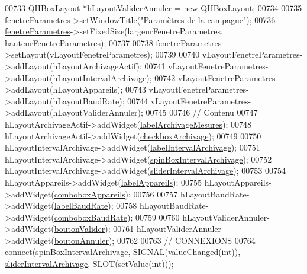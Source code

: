 \begin{DoxyCode}
00733     QHBoxLayout *hLayoutValiderAnnuler = \textcolor{keyword}{new} QHBoxLayout;
00734 
00735     \hyperlink{class_i_h_m_rov_a277956dfb79e5345e5ae0117fe41ddf2}{fenetreParametres}->setWindowTitle(\textcolor{stringliteral}{"Paramètres de la campagne"});
00736     \hyperlink{class_i_h_m_rov_a277956dfb79e5345e5ae0117fe41ddf2}{fenetreParametres}->setFixedSize(largeurFenetreParametres, hauteurFenetreParametres);
00737 
00738     \hyperlink{class_i_h_m_rov_a277956dfb79e5345e5ae0117fe41ddf2}{fenetreParametres}->setLayout(vLayoutFenetreParametres);
00739 
00740     vLayoutFenetreParametres->addLayout(hLayoutArchivageActif);
00741     vLayoutFenetreParametres->addLayout(hLayoutIntervalArchivage);
00742     vLayoutFenetreParametres->addLayout(hLayoutAppareils);
00743     vLayoutFenetreParametres->addLayout(hLayoutBaudRate);
00744     vLayoutFenetreParametres->addLayout(hLayoutValiderAnnuler);
00745 
00746     \textcolor{comment}{// Contenu}
00747     hLayoutArchivageActif->addWidget(\hyperlink{class_i_h_m_rov_a58e157352986f690bca4b79b9b05ee1d}{labelArchivageMesures});
00748     hLayoutArchivageActif->addWidget(\hyperlink{class_i_h_m_rov_a85be76b5fee7281642db582a79a53511}{checkboxArchivage});
00749 
00750     hLayoutIntervalArchivage->addWidget(\hyperlink{class_i_h_m_rov_a42fb93c9764bfc2fe81ba65fc02d8de2}{labelIntervalArchivage});
00751     hLayoutIntervalArchivage->addWidget(\hyperlink{class_i_h_m_rov_abc906e8e992ecdf5eb1dae5dc622b768}{spinBoxIntervalArchivage});
00752     hLayoutIntervalArchivage->addWidget(\hyperlink{class_i_h_m_rov_a8c55c93ee14ee51335e72af07b521312}{sliderIntervalArchivage});
00753 
00754     hLayoutAppareils->addWidget(\hyperlink{class_i_h_m_rov_ac6f93c34da2a4e24f743e61fd5d62405}{labelAppareils});
00755     hLayoutAppareils->addWidget(\hyperlink{class_i_h_m_rov_a12b970f1d2a170f14a01a684787904a5}{comboboxAppareils});
00756 
00757     hLayoutBaudRate->addWidget(\hyperlink{class_i_h_m_rov_a6e9a97a5cd38bfd92e6114c4299be7ee}{labelBaudRate});
00758     hLayoutBaudRate->addWidget(\hyperlink{class_i_h_m_rov_a542c0cf87de612cd529b0753b60e4f95}{comboboxBaudRate});
00759 
00760     hLayoutValiderAnnuler->addWidget(\hyperlink{class_i_h_m_rov_a4294b6c808089083906fb0815d1c9c27}{boutonValider});
00761     hLayoutValiderAnnuler->addWidget(\hyperlink{class_i_h_m_rov_a4a6fec1b4a86c93c1d0d62d66804db5c}{boutonAnnuler});
00762 
00763     \textcolor{comment}{// CONNEXIONS}
00764     connect(\hyperlink{class_i_h_m_rov_abc906e8e992ecdf5eb1dae5dc622b768}{spinBoxIntervalArchivage}, SIGNAL(valueChanged(\textcolor{keywordtype}{int})), 
      \hyperlink{class_i_h_m_rov_a8c55c93ee14ee51335e72af07b521312}{sliderIntervalArchivage}, SLOT(setValue(\textcolor{keywordtype}{int})));

\end{DoxyCode}
